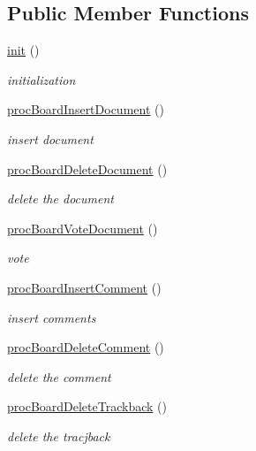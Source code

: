 \subsection*{Public Member Functions}
\begin{DoxyCompactItemize}
\item 
\hyperlink{classboardController_a1e9dcbf2879520adc6c5ce9b68361408}{init} ()
\begin{DoxyCompactList}\small\item\em initialization \end{DoxyCompactList}\item 
\hyperlink{classboardController_a14ee978c5be08ee33f4c00a6960c4e60}{proc\-Board\-Insert\-Document} ()
\begin{DoxyCompactList}\small\item\em insert document \end{DoxyCompactList}\item 
\hyperlink{classboardController_a3e67502fb41d52a0425f40906029576b}{proc\-Board\-Delete\-Document} ()
\begin{DoxyCompactList}\small\item\em delete the document \end{DoxyCompactList}\item 
\hyperlink{classboardController_a8ff91d133ca5ca109b91f218ff306738}{proc\-Board\-Vote\-Document} ()
\begin{DoxyCompactList}\small\item\em vote \end{DoxyCompactList}\item 
\hyperlink{classboardController_ab643a9d4d386833e92bc2d7114319fb2}{proc\-Board\-Insert\-Comment} ()
\begin{DoxyCompactList}\small\item\em insert comments \end{DoxyCompactList}\item 
\hyperlink{classboardController_af5cfe27b152d9806acf0ced54299b0ea}{proc\-Board\-Delete\-Comment} ()
\begin{DoxyCompactList}\small\item\em delete the comment \end{DoxyCompactList}\item 
\hyperlink{classboardController_a8a71a5c163777a169a3e843c2f6dafae}{proc\-Board\-Delete\-Trackback} ()
\begin{DoxyCompactList}\small\item\em delete the tracjback \end{DoxyCompactList}\item 

\end{DoxyCompactItemize}
